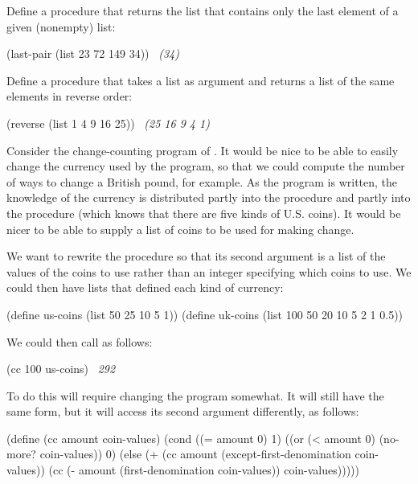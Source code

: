 \begin{exerciseGroup}
\label{Exercise 2.17}
 Define a procedure
 that returns the list that contains only the last element of a
given (nonempty) list:

\begin{codeBlock}
(last-pair (list 23 72 149 34))
~\textit{(34)}~
\end{codeBlock}

\label{Exercise 2.18}
 Define a procedure 
that takes a list as argument and returns a list of the same elements in
reverse order:

\begin{codeBlock}
(reverse (list 1 4 9 16 25))
~\textit{(25 16 9 4 1)}~
\end{codeBlock}

\label{Exercise 2.19}
 Consider the change-counting
program of .  It would be nice to be able to easily change
the currency used by the program, so that we could compute the number of ways
to change a British pound, for example.  As the program is written, the
knowledge of the currency is distributed partly into the procedure
 and partly into the procedure 
(which knows that there are five kinds of U.S. coins).  It would be nicer to be
able to supply a list of coins to be used for making change.

We want to rewrite the procedure  so that its second argument is a
list of the values of the coins to use rather than an integer specifying which
coins to use.  We could then have lists that defined each kind of currency:

\begin{codeBlock}
(define us-coins (list 50 25 10 5 1))
(define uk-coins (list 100 50 20 10 5 2 1 0.5))
\end{codeBlock}

We could then call  as follows:

\begin{codeBlock}
(cc 100 us-coins)
~\textit{292}~
\end{codeBlock}

To do this will require changing the program  somewhat.  It will still
have the same form, but it will access its second argument differently, as
follows:

\begin{codeBlock}
(define (cc amount coin-values)
  (cond ((= amount 0) 1)
        ((or (< amount 0) (no-more? coin-values)) 0)
        (else
         (+ (cc amount
                (except-first-denomination
                 coin-values))
            (cc (- amount
                   (first-denomination
                    coin-values))
                coin-values)))))
\end{codeBlock}


\end{exerciseGroup}
